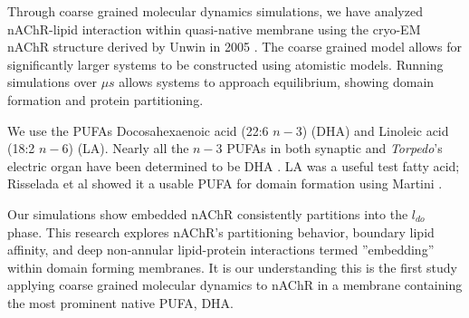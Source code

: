 Through coarse grained molecular dynamics simulations, we have analyzed nAChR-lipid interaction within quasi-native membrane using the cryo-EM nAChR structure derived by Unwin in 2005 \cite{Unwin_Refined_2005}. The coarse grained model allows for significantly larger systems to be constructed using atomistic models. Running simulations over $\mu s$ allows systems to approach equilibrium, showing domain formation and protein partitioning. 

We use the PUFAs Docosahexaenoic acid (22:6 $n-3$) (DHA) and Linoleic acid (18:2 $n-6$) (LA). Nearly all the $n-3$ PUFAs in both synaptic and \textit{Torpedo}'s electric organ have been determined to be DHA \cite{Breckenridge_Adult_1973,Cotman_Lipid_1969,8DAAC844-CF26-B5A6-FE56-AEE1F681B8A3,Quesada_Uncovering_2016}. LA was a useful test fatty acid; Risselada et al \cite{Risselada_The_2008} showed it a usable PUFA for domain formation using Martini \cite{martini}.

Our simulations show embedded nAChR consistently partitions into the  $l_{do}$ phase. This research explores nAChR's partitioning behavior, boundary lipid affinity, and deep non-annular lipid-protein interactions termed ''embedding'' within domain forming membranes. It is our understanding this is the first study applying coarse grained molecular dynamics to nAChR in a membrane containing the most prominent native PUFA, DHA.